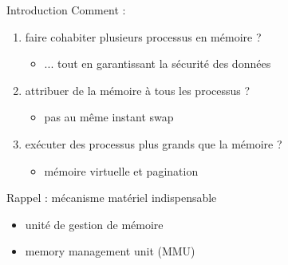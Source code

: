 \def\inc{inc2-5-mem}




\begin {frame} {Introduction}
    Comment :
    \begin {enumerate}
	\item faire cohabiter plusieurs processus en mémoire ?
	    \begin {itemize}
		\item ... tout en garantissant la sécurité des données
	    \end {itemize}
	\item attribuer de la mémoire à tous les processus ?
	    \begin {itemize}
		\item pas au même instant \implique swap
	    \end {itemize}
	\item exécuter des processus plus grands que la mémoire ?
	    \begin {itemize}
		\item mémoire virtuelle et pagination
	    \end {itemize}
    \end {enumerate}

    \vspace* {3mm}

    Rappel : mécanisme matériel indispensable
    \begin {itemize}
	\item unité de gestion de mémoire
	\item memory management unit (MMU)
    \end {itemize}
\end {frame}



